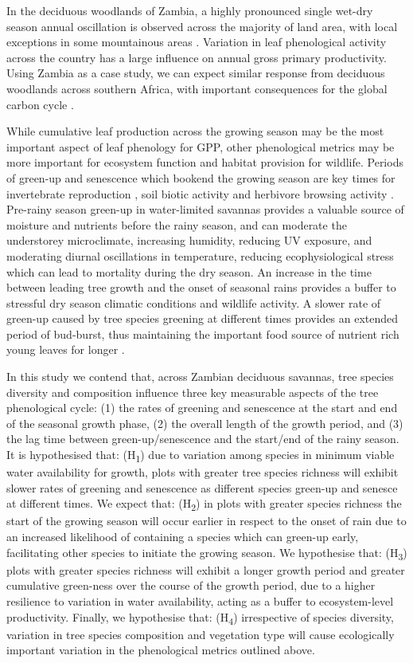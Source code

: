\documentclass[11pt,a4paper]{article}
\begin{document}
In the deciduous woodlands of Zambia, a highly pronounced single wet-dry season annual oscillation is observed across the majority of land area, with local exceptions in some mountainous areas \citep{}. Variation in leaf phenological activity across the country has a large influence on annual gross primary productivity. Using Zambia as a case study, we can expect similar response from deciduous woodlands across southern Africa, with important consequences for the global carbon cycle \citep{}. 

While cumulative leaf production across the growing season may be the most
important aspect of leaf phenology for GPP, other phenological metrics may be
more important for ecosystem function and habitat provision for wildlife.
Periods of green-up and senescence which bookend the growing season are key
times for invertebrate reproduction \citep{}, soil biotic activity \citep{} and
herbivore browsing activity \citep{}. Pre-rainy season green-up in water-limited
savannas provides a valuable source of moisture and nutrients before the rainy
season, and can moderate the understorey microclimate, increasing humidity,
reducing UV exposure, and moderating diurnal oscillations in temperature,
reducing ecophysiological stress which can lead to mortality during the dry
season. An increase in the time between leading tree growth and the onset of
seasonal rains provides a buffer to stressful dry season climatic conditions and
wildlife activity. A slower rate of green-up caused by tree species greening at
different times provides an extended period of bud-burst, thus maintaining the
important food source of nutrient rich young leaves for longer \citep{}. 
 
In this study we contend that, across Zambian deciduous savannas, tree species
diversity and composition influence three key measurable aspects of the tree
phenological cycle: (1) the rates of greening and senescence at the start and
end of the seasonal growth phase, (2) the overall length of the growth period,
and (3) the lag time between green-up/senescence and the start/end of the
rainy season. It is hypothesised that: (H\textsubscript{1}) due to variation
among species in minimum viable water availability for growth, plots with
greater tree species richness will exhibit slower rates of greening and
senescence as different species green-up and senesce at different times. We
expect that: (H\textsubscript{2}) in plots with greater species richness the
start of the growing season will occur earlier in respect to the onset of rain
due to an increased likelihood of containing a species which can green-up
early, facilitating other species to initiate the growing season. We
hypothesise that: (H\textsubscript{3}) plots with greater species richness
will exhibit a longer growth period and greater cumulative green-ness over the
course of the growth period, due to a higher resilience to variation in water
availability, acting as a buffer to ecosystem-level productivity. Finally, we
hypothesise that: (H\textsubscript{4}) irrespective of species diversity,
variation in tree species composition and vegetation type will cause
ecologically important variation in the phenological metrics outlined above. 
\end{document}
